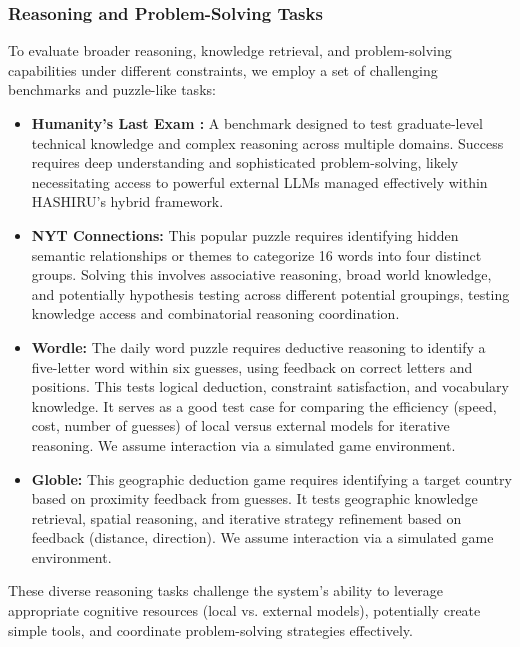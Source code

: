 \documentclass[conference]{IEEEtran}
\begin{document}
\subsubsection{Reasoning and Problem-Solving Tasks}
To evaluate broader reasoning, knowledge retrieval, and problem-solving capabilities under different constraints, we employ a set of challenging benchmarks and puzzle-like tasks:
\begin{itemize}
    \item \textbf{Humanity's Last Exam \cite{phan2025humanitysexam}:} A benchmark designed to test graduate-level technical knowledge and complex reasoning across multiple domains. Success requires deep understanding and sophisticated problem-solving, likely necessitating access to powerful external LLMs managed effectively within HASHIRU's hybrid framework.
    \item \textbf{NYT Connections:} This popular puzzle requires identifying hidden semantic relationships or themes to categorize 16 words into four distinct groups. Solving this involves associative reasoning, broad world knowledge, and potentially hypothesis testing across different potential groupings, testing knowledge access and combinatorial reasoning coordination.
    \item \textbf{Wordle:} The daily word puzzle requires deductive reasoning to identify a five-letter word within six guesses, using feedback on correct letters and positions. This tests logical deduction, constraint satisfaction, and vocabulary knowledge. It serves as a good test case for comparing the efficiency (speed, cost, number of guesses) of local versus external models for iterative reasoning. We assume interaction via a simulated game environment.
    \item \textbf{Globle:} This geographic deduction game requires identifying a target country based on proximity feedback from guesses. It tests geographic knowledge retrieval, spatial reasoning, and iterative strategy refinement based on feedback (distance, direction). We assume interaction via a simulated game environment. 
\end{itemize}
These diverse reasoning tasks challenge the system's ability to leverage appropriate cognitive resources (local vs. external models), potentially create simple tools, and coordinate problem-solving strategies effectively.
\end{document}
